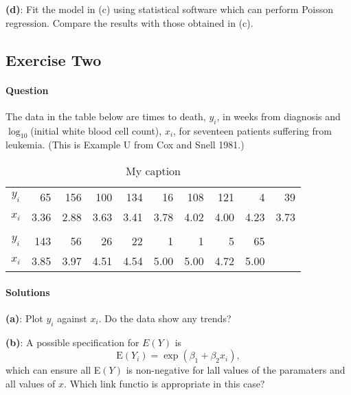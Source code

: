 \documentclass[]{article}
\let\oldparagraph\paragraph
\renewcommand{\paragraph}[1]{\oldparagraph{#1}\mbox{}}
\begin{document}
\textbf{(d)}: Fit the model in (c) using statistical software which can
perform Poisson regression. Compare the results with those obtained in
(c).

\pagebreak

\subsection{Exercise Two}\label{exercise-two}

\paragraph{Question}\label{question-1}

The data in the table below are times to death, \(y_i\), in weeks from
diagnosis and \(\log_{10}\)(initial white blood cell count), \(x_i\),
for seventeen patients suffering from leukemia. (This is Example U from
Cox and Snell 1981.)

\begin{center}
\begin{table}[]
\centering
\caption{My caption}
\label{my-label}
\begin{tabular}{@{}crrrrrrrrr@{}}
\toprule
$y_i$ & 65   & 156  & 100  & 134  & 16   & 108  & 121  & 4    & 39   \\
$x_i$ & 3.36 & 2.88 & 3.63 & 3.41 & 3.78 & 4.02 & 4.00 & 4.23 & 3.73 \\
      &      &      &      &      &      &      &      &      &      \\
$y_i$ & 143  & 56   & 26   & 22   & 1    & 1    & 5    & 65   &      \\
$x_i$ & 3.85 & 3.97 & 4.51 & 4.54 & 5.00 & 5.00 & 4.72 & 5.00 &      \\ \bottomrule
\end{tabular}
\end{table}
\end{center}

\paragraph{Solutions}\label{solutions-1}

\textbf{(a)}: Plot \(y_i\) against \(x_i\). Do the data show any trends?

\textbf{(b)}: A possible specification for \(E(Y)\) is \[
\text{E}(Y_i) = \exp(\beta_1 + \beta_2x_i),
\] which can ensure all E\((Y)\) is non-negative for lall values of the
paramaters and all values of \(x\). Which link functio is appropriate in
this case?
\end{document}
